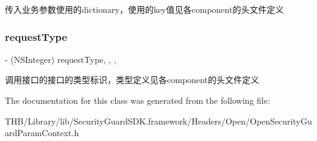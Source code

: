 传入业务参数使用的dictionary，使用的key值见各component的头文件定义 \mbox{\label{interface_open_security_guard_param_context_a7d6edca9cf8d72f6d92bae20b6fafba7}} 
\subsubsection{\texorpdfstring{request\+Type}{requestType}}
{\footnotesize\ttfamily -\/ (N\+S\+Integer) request\+Type\hspace{0.3cm}{\ttfamily [read]}, {\ttfamily [write]}, {\ttfamily [nonatomic]}, {\ttfamily [assign]}}

调用接口的接口的类型标识，类型定义见各component的头文件定义 

The documentation for this class was generated from the following file\+:\begin{DoxyCompactItemize}
\item 
T\+H\+B/\+Library/lib/\+Security\+Guard\+S\+D\+K.\+framework/\+Headers/\+Open/Open\+Security\+Guard\+Param\+Context.\+h\end{DoxyCompactItemize}
